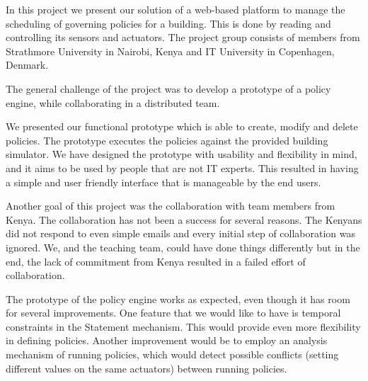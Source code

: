 In this project we present our solution of a web-based platform to manage the scheduling of governing policies for a building. This is done by reading and controlling its sensors and actuators. The project group consists of members from Strathmore University in Nairobi, Kenya and IT University in Copenhagen, Denmark.

The general challenge of the project was to develop a prototype of a policy engine, while collaborating in a distributed team. 

We presented our functional prototype which is able to create, modify and delete policies. The prototype executes the policies against the provided building simulator. We have designed the prototype with usability and flexibility in mind, and it aims to be used by people that are not IT experts. This resulted in having a simple and user friendly interface that is manageable by the end users. 

Another goal of this project was the collaboration with team members from Kenya. The collaboration has not been a success for several reasons. The Kenyans did not respond to even simple emails and every initial step of collaboration was ignored. We, and the teaching team, could have done things differently but in the end, the lack of commitment from Kenya resulted in a failed effort of collaboration.
 
The prototype of the policy engine works as expected, even though it has room for several improvements. One feature that we would like to have is temporal constraints in the Statement mechanism. This would provide even more flexibility in defining policies. Another improvement would be to employ an analysis mechanism of running policies, which would detect possible conflicts (setting different values on the same actuators) between running policies.


